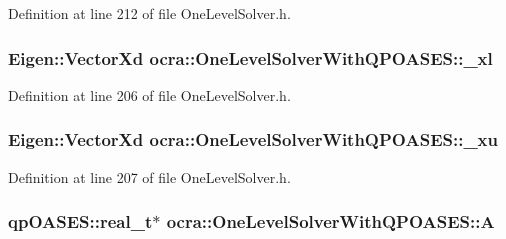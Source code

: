 Definition at line 212 of file One\+Level\+Solver.\+h.

\subsubsection[{\texorpdfstring{\+\_\+xl}{_xl}}]{\setlength{\rightskip}{0pt plus 5cm}Eigen\+::\+Vector\+Xd ocra\+::\+One\+Level\+Solver\+With\+Q\+P\+O\+A\+S\+E\+S\+::\+\_\+xl\hspace{0.3cm}{\ttfamily [protected]}}\hypertarget{classocra_1_1OneLevelSolverWithQPOASES_a67a41fa1b101ce2885012b796c8bfe47}{}\label{classocra_1_1OneLevelSolverWithQPOASES_a67a41fa1b101ce2885012b796c8bfe47}


Definition at line 206 of file One\+Level\+Solver.\+h.

\subsubsection[{\texorpdfstring{\+\_\+xu}{_xu}}]{\setlength{\rightskip}{0pt plus 5cm}Eigen\+::\+Vector\+Xd ocra\+::\+One\+Level\+Solver\+With\+Q\+P\+O\+A\+S\+E\+S\+::\+\_\+xu\hspace{0.3cm}{\ttfamily [protected]}}\hypertarget{classocra_1_1OneLevelSolverWithQPOASES_a23dd435ea8582fc67bf77373e0afc3e0}{}\label{classocra_1_1OneLevelSolverWithQPOASES_a23dd435ea8582fc67bf77373e0afc3e0}


Definition at line 207 of file One\+Level\+Solver.\+h.

\subsubsection[{\texorpdfstring{A}{A}}]{\setlength{\rightskip}{0pt plus 5cm}qp\+O\+A\+S\+E\+S\+::real\+\_\+t$\ast$ ocra\+::\+One\+Level\+Solver\+With\+Q\+P\+O\+A\+S\+E\+S\+::A\hspace{0.3cm}{\ttfamily [protected]}}\hypertarget{classocra_1_1OneLevelSolverWithQPOASES_a8263c27c6bda731ab9dc9550a668e491}{}\label{classocra_1_1OneLevelSolverWithQPOASES_a8263c27c6bda731ab9dc9550a668e491}


